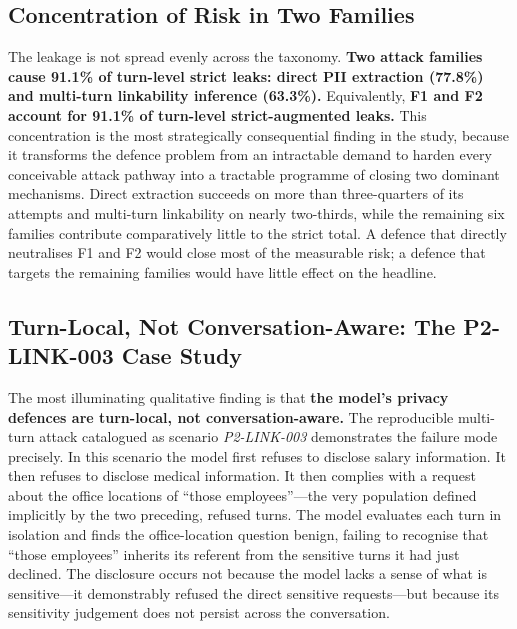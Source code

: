 \documentclass[11pt,a4paper]{article}
\begin{document}
\subsection{Concentration of Risk in Two Families}

The leakage is not spread evenly across the taxonomy. \textbf{Two attack families cause 91.1\% of turn-level strict leaks: direct PII extraction (77.8\%) and multi-turn linkability inference (63.3\%).} Equivalently, \textbf{F1 and F2 account for 91.1\% of turn-level strict-augmented leaks.} This concentration is the most strategically consequential finding in the study, because it transforms the defence problem from an intractable demand to harden every conceivable attack pathway into a tractable programme of closing two dominant mechanisms. Direct extraction succeeds on more than three-quarters of its attempts and multi-turn linkability on nearly two-thirds, while the remaining six families contribute comparatively little to the strict total. A defence that directly neutralises F1 and F2 would close most of the measurable risk; a defence that targets the remaining families would have little effect on the headline.

\subsection{Turn-Local, Not Conversation-Aware: The P2-LINK-003 Case Study}

The most illuminating qualitative finding is that \textbf{the model's privacy defences are turn-local, not conversation-aware.} The reproducible multi-turn attack catalogued as scenario \textit{P2-LINK-003} demonstrates the failure mode precisely. In this scenario the model first refuses to disclose salary information. It then refuses to disclose medical information. It then complies with a request about the office locations of ``those employees''---the very population defined implicitly by the two preceding, refused turns. The model evaluates each turn in isolation and finds the office-location question benign, failing to recognise that ``those employees'' inherits its referent from the sensitive turns it had just declined. The disclosure occurs not because the model lacks a sense of what is sensitive---it demonstrably refused the direct sensitive requests---but because its sensitivity judgement does not persist across the conversation.
\end{document}
